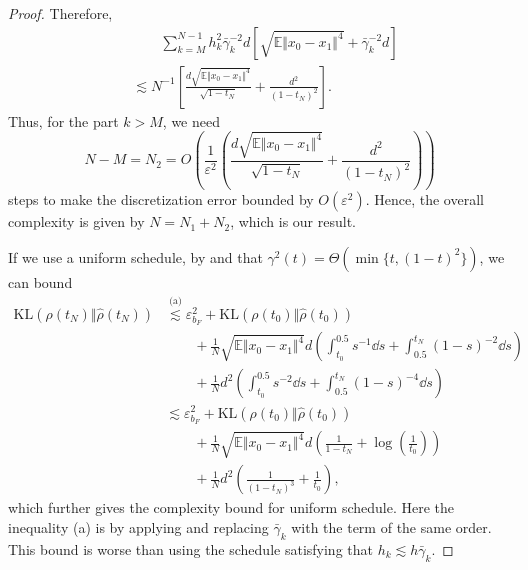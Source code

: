 \begin{proof}
    Therefore,
    $$\begin{aligned}
        &\qquad\sum_{k=M}^{N-1}h_k^2\bar{\gamma}_k^{-2}d\left[\sqrt{\mathbb{E}\Vert x_0-x_1\Vert^4}+\bar{\gamma}_k^{-2}d\right]\\
        &\lesssim N^{-1}\left[\frac{d\sqrt{\mathbb{E}\Vert x_0-x_1\Vert^4}}{\sqrt{1-t_N}}+\frac{d^2}{(1-t_N)^{2}}\right].
    \end{aligned}$$
    Thus, for the part $k>M$, we need $$N-M=N_2=O\left(\frac{1}{\varepsilon^2}\left(\frac{d\sqrt{\mathbb{E}\Vert x_0-x_1\Vert^4}}{\sqrt{1-t_N}}+\frac{d^2}{(1-t_N)^{2}}\right)\right)$$
    steps to make the discretization error bounded by $O(\varepsilon^2)$. Hence, the overall complexity is given by $N=N_1+N_2$, which is our result.

    If we use a uniform schedule, by  and that $\gamma^2(t)=\Theta(\min\{t,(1-t)^2\})$, we can bound
    $$\begin{aligned}
        \text{KL}(\rho(t_N)\Vert\hat{\rho}(t_N))&\overset{\text{(a)}}{\lesssim}\varepsilon_{b_F}^2+\text{KL}(\rho(t_0)\Vert\hat{\rho}(t_0))\\
        &\qquad+\frac{1}{N}\sqrt{\mathbb{E}\Vert x_0-x_1\Vert^4}d\left(\int_{t_0}^{0.5}s^{-1}\dd s+\int_{0.5}^{t_N}(1-s)^{-2}\dd s\right)\\
        &\qquad+\frac{1}{N}d^2\left(\int_{t_0}^{0.5}s^{-2}\dd s+\int_{0.5}^{t_N}(1-s)^{-4}\dd s\right)\\
        &\lesssim\varepsilon_{b_F}^2+\text{KL}(\rho(t_0)\Vert\hat{\rho}(t_0))\\
        &\qquad+\frac{1}{N}\sqrt{\mathbb{E}\Vert x_0-x_1\Vert^4}d\left(\frac{1}{1-t_N}+\log\left(\frac{1}{t_0}\right)\right)\\
        &\qquad+\frac{1}{N}d^2\left(\frac{1}{(1-t_N)^3}+\frac{1}{t_0}\right),
    \end{aligned}$$
    which further gives the complexity bound for uniform schedule. Here the inequality (a) is by applying  and replacing $\bar{\gamma}_k$ with the term of the same order. This bound is worse than using the schedule satisfying that $h_k\lesssim h\bar{\gamma}_k$.
\end{proof}